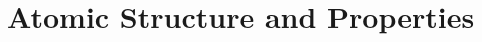 \documentclass[../chem.tex]{subfiles}
\begin{document}
\chapter{Atomic Structure and Properties}
\end{document}
